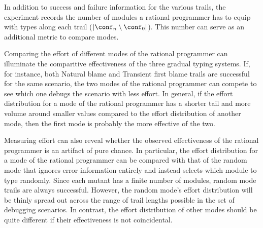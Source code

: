 
In addition to success and failure information for the various trails, the
experiment records the number of modules a rational programmer has
to equip with types along each trail ($\lvert \conf_n \setminus \conf_0
\rvert$). This number can serve as an additional metric to compare modes.

Comparing the effort of different modes of the rational programmer can
illuminate the comparitive effectiveness of the three gradual typing
systems. If, for instance, both
Natural blame and Transient first blame trails are successful for the same scenario, the two modes of
the rational programmer can compete to see which one debugs the
scenario with less effort. In general, if the effort distribution for a mode of
the rational programmer has a shorter tail and more volume around smaller values
compared to the effort distribution of another mode, then the first mode is
probably the more effective of the two.

Measuring effort can also reveal whether the observed effectiveness of the
rational programmer is an artifact of pure chance.
In particular, the effort distribution for a mode of the rational programmer can be compared with that of
the random mode that ignores error information entirely and instead selects which
module to type randomly.  Since each mutant has a finite number of
modules, random mode trails are always successful. However, the random mode's effort
distribution will be thinly spread out across the range of trail lengths possible
in the set of debugging scenarios.
In contrast, the effort distribution of other modes should be quite different if their effectiveness is not coincidental.
